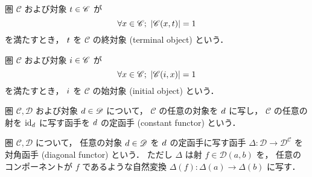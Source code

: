 \documentclass[titlepage]{ltjsreport}
\newcommand{\cat}[1]{\mathscr{#1}}
\newcommand{\obj}[1]{\lowercase{#1}}
\newcommand{\objs}[1]{#1}
\newcommand{\mrp}[3]{{#1}:{#2}\to{#3}}
\newcommand{\mrps}[3]{#1(#2,#3)}
\newcommand{\id}[1]{\mathrm{id}_{#1}}
\begin{document}
\begin{definition}[終対象]
  圏 $\cat{C}$ および対象 $\obj{t}\in\objs{\cat{C}}$ が
  \begin{equation}
    \forall\obj{x}\in\objs{\cat{C}};\ |\mrps{\cat{C}}{\obj{x}}{\obj{t}}|=1
  \end{equation}
  を満たすとき，
  $\obj{t}$ を $\cat{C}$ の終対象 (terminal object) という．
\end{definition}

\begin{definition}[始対象]
  圏 $\cat{C}$ および対象 $\obj{i}\in\objs{\cat{C}}$ が
  \begin{equation}
    \forall\obj{x}\in\objs{\cat{C}};\ |\mrps{\cat{C}}{\obj{i}}{\obj{x}}|=1
  \end{equation}
  を満たすとき，
  $\obj{i}$ を $\cat{C}$ の始対象 (initial object) という．
\end{definition}

\begin{center}
\end{center}

\begin{definition}[定函手]
  圏 $\cat{C},\cat{D}$ および対象 $\obj{d}\in\objs{\cat{D}}$ について，
  $\cat{C}$ の任意の対象を $\obj{d}$ に写し，
  $\cat{C}$ の任意の射を $\id{\obj{d}}$ に写す函手を
  $\obj{d}$ の定函手 (constant functor) という．
\end{definition}

\begin{definition}[対角函手]
  圏 $\cat{C},\cat{D}$ について，
  任意の対象 $\obj{d}\in\objs{\cat{D}}$ を $\obj{d}$ の定函手に写す函手
  $\mrp{\Delta}{\cat{D}}{\cat{D}^{\cat{C}}}$ を対角函手 (diagonal functor) という．
  ただし $\Delta$ は射 $f\in\mrps{\cat{D}}{a}{b}$ を，
  任意のコンポーネントが $f$ であるような自然変換
  $\mrp{\Delta(f)}{\Delta(a)}{\Delta(b)}$ に写す．
\end{definition}
\end{document}
